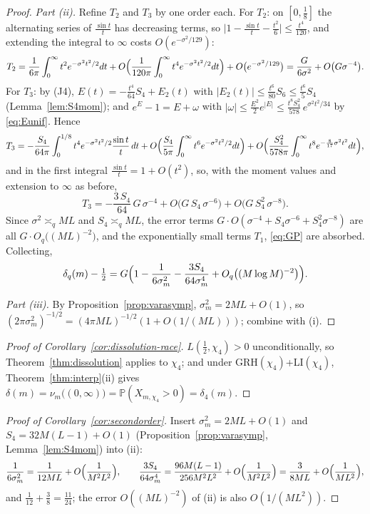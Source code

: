 \begin{proof}
\emph{Part (ii).} Refine $T_2$ and $T_3$ by one order each. For
$T_2$: on $[0,\tfrac18]$ the alternating series of $\frac{\sin t}t$
has decreasing terms, so
$\bigl|1-\frac{\sin t}t-\frac{t^2}6\bigr|\le\frac{t^4}{120}$, and
extending the integral to $\infty$ costs $O(e^{-\sigma^2/129})$:
\[
T_2=\frac1{6\pi}\int_0^{\infty}t^2e^{-\sigma^2t^2/2}dt
+O\Bigl(\frac1{120\pi}\int_0^\infty t^4e^{-\sigma^2t^2/2}dt\Bigr)
+O\bigl(e^{-\sigma^2/129}\bigr)
=\frac{G}{6\sigma^2}+O\bigl(G\sigma^{-4}\bigr).
\]
For $T_3$: by (J4), $E(t)=-\frac{t^4}{64}S_4+E_2(t)$ with
$|E_2(t)|\le\frac{t^6}{80}S_6\le\frac{t^6}{5}S_4$
(Lemma~\ref{lem:S4mom}); and $e^E-1=E+\omega$ with
$|\omega|\le\frac{E^2}2e^{|E|}
\le\frac{t^8S_4^2}{578}\,e^{\sigma^2t^2/34}$ by \eqref{eq:Eunif}.
Hence
\[
T_3=-\frac{S_4}{64\pi}\int_0^{1/8}t^4e^{-\sigma^2t^2/2}
\frac{\sin t}t\,dt
+O\Bigl(\frac{S_4}{5\pi}\int_0^\infty
t^6e^{-\sigma^2t^2/2}dt\Bigr)
+O\Bigl(\frac{S_4^2}{578\pi}\int_0^\infty
t^8e^{-\frac{8}{17}\sigma^2t^2}dt\Bigr),
\]
and in the first integral $\frac{\sin t}t=1+O(t^2)$, so, with the
moment values and extension to $\infty$ as before,
\[
T_3=-\frac{3\,S_4}{64}\,G\,\sigma^{-4}
+O\bigl(G\,S_4\,\sigma^{-6}\bigr)
+O\bigl(G\,S_4^2\,\sigma^{-8}\bigr).
\]
Since $\sigma^2\asymp_qML$ and $S_4\asymp_qML$, the error terms
$G\cdot O(\sigma^{-4}+S_4\sigma^{-6}+S_4^2\sigma^{-8})$ are all
$G\cdot O_q\bigl((ML)^{-2}\bigr)$, and the exponentially small terms
$T_1$, \eqref{eq:GP} are absorbed. Collecting,
\[
\delta_q(m)-\tfrac12
=G\Bigl(1-\frac1{6\sigma_m^2}-\frac{3S_4}{64\sigma_m^4}
+O_q\bigl((M\log M)^{-2}\bigr)\Bigr).
\]

\emph{Part (iii).} By Proposition~\ref{prop:varasymp},
$\sigma_m^2=2ML+O(1)$, so
$(2\pi\sigma_m^2)^{-1/2}=(4\pi ML)^{-1/2}(1+O(1/(ML)))$; combine with
(i).
\end{proof}

\begin{proof}[Proof of Corollary~\ref{cor:dissolution-race}]
$L(\tfrac12,\chi_4)>0$ unconditionally, so
Theorem~\ref{thm:dissolution} applies to $\chi_4$; and under
GRH$(\chi_4)$+LI$(\chi_4)$, Theorem~\ref{thm:interp}(ii) gives
$\delta(m)=\nu_m\bigl((0,\infty)\bigr)=\mathbb P(X_{m,\chi_4}>0)
=\delta_4(m)$.
\end{proof}

\begin{proof}[Proof of Corollary~\ref{cor:secondorder}]
Insert $\sigma_m^2=2ML+O(1)$ and
$S_4=32M(L-1)+O(1)$ (Proposition~\ref{prop:varasymp},
Lemma~\ref{lem:S4mom}) into (ii):
\[
\frac1{6\sigma_m^2}=\frac1{12ML}+O\Bigl(\frac1{M^2L^2}\Bigr),
\qquad
\frac{3S_4}{64\sigma_m^4}
=\frac{96M(L-1)}{256M^2L^2}+O\Bigl(\frac1{M^2L^2}\Bigr)
=\frac{3}{8ML}+O\Bigl(\frac1{ML^2}\Bigr),
\]
and $\frac1{12}+\frac38=\frac{11}{24}$; the error
$O((ML)^{-2})$ of (ii) is also $O(1/(ML^2))$.
\end{proof}

